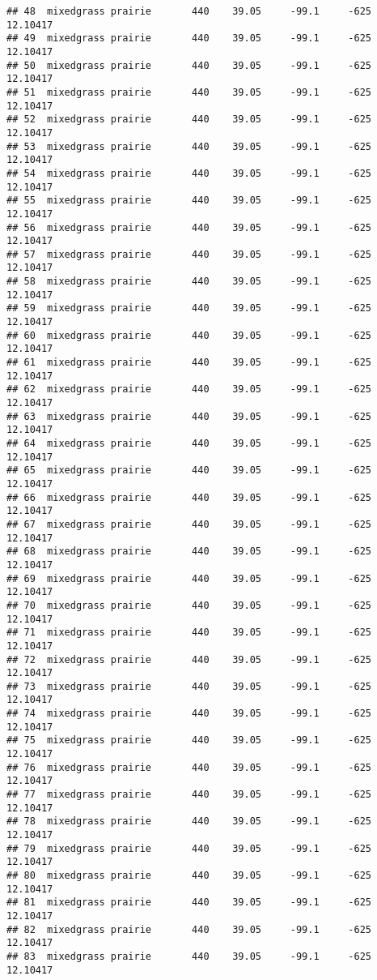 \documentclass[]{article}
\begin{document}
\begin{verbatim}
## 48  mixedgrass prairie       440    39.05     -99.1     -625 12.10417
## 49  mixedgrass prairie       440    39.05     -99.1     -625 12.10417
## 50  mixedgrass prairie       440    39.05     -99.1     -625 12.10417
## 51  mixedgrass prairie       440    39.05     -99.1     -625 12.10417
## 52  mixedgrass prairie       440    39.05     -99.1     -625 12.10417
## 53  mixedgrass prairie       440    39.05     -99.1     -625 12.10417
## 54  mixedgrass prairie       440    39.05     -99.1     -625 12.10417
## 55  mixedgrass prairie       440    39.05     -99.1     -625 12.10417
## 56  mixedgrass prairie       440    39.05     -99.1     -625 12.10417
## 57  mixedgrass prairie       440    39.05     -99.1     -625 12.10417
## 58  mixedgrass prairie       440    39.05     -99.1     -625 12.10417
## 59  mixedgrass prairie       440    39.05     -99.1     -625 12.10417
## 60  mixedgrass prairie       440    39.05     -99.1     -625 12.10417
## 61  mixedgrass prairie       440    39.05     -99.1     -625 12.10417
## 62  mixedgrass prairie       440    39.05     -99.1     -625 12.10417
## 63  mixedgrass prairie       440    39.05     -99.1     -625 12.10417
## 64  mixedgrass prairie       440    39.05     -99.1     -625 12.10417
## 65  mixedgrass prairie       440    39.05     -99.1     -625 12.10417
## 66  mixedgrass prairie       440    39.05     -99.1     -625 12.10417
## 67  mixedgrass prairie       440    39.05     -99.1     -625 12.10417
## 68  mixedgrass prairie       440    39.05     -99.1     -625 12.10417
## 69  mixedgrass prairie       440    39.05     -99.1     -625 12.10417
## 70  mixedgrass prairie       440    39.05     -99.1     -625 12.10417
## 71  mixedgrass prairie       440    39.05     -99.1     -625 12.10417
## 72  mixedgrass prairie       440    39.05     -99.1     -625 12.10417
## 73  mixedgrass prairie       440    39.05     -99.1     -625 12.10417
## 74  mixedgrass prairie       440    39.05     -99.1     -625 12.10417
## 75  mixedgrass prairie       440    39.05     -99.1     -625 12.10417
## 76  mixedgrass prairie       440    39.05     -99.1     -625 12.10417
## 77  mixedgrass prairie       440    39.05     -99.1     -625 12.10417
## 78  mixedgrass prairie       440    39.05     -99.1     -625 12.10417
## 79  mixedgrass prairie       440    39.05     -99.1     -625 12.10417
## 80  mixedgrass prairie       440    39.05     -99.1     -625 12.10417
## 81  mixedgrass prairie       440    39.05     -99.1     -625 12.10417
## 82  mixedgrass prairie       440    39.05     -99.1     -625 12.10417
## 83  mixedgrass prairie       440    39.05     -99.1     -625 12.10417

\end{verbatim}
\end{document}
